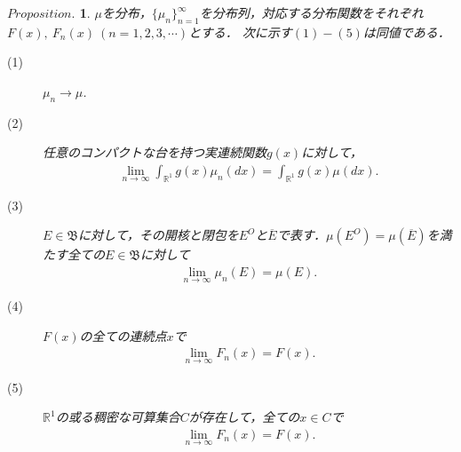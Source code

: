 \documentclass[a4j,papersize,disablejfam,slide,14pt]{jsarticle}
\newtheorem{Prop}{$Proposition.$}
\begin{document}
    \begin{screen}
    	\begin{Prop}
        \label{Prop:convergence_distribution}
        	$\mu$を分布，$\{ \mu_n \}_{n=1}^{\infty}$を分布列，対応する分布関数をそれぞれ$F(x),\ F_n(x)\ (n=1,2,3,\cdots)$とする．
        	次に示す$(1)-(5)$は同値である．
            \begin{description}
            	\item[(1)]\qquad  $\mu_n \to \mu$.
                \item[(2)]\qquad 任意のコンパクトな台を持つ実連続関数$g(x)$に対して，
                	\begin{align}
                		\lim_{n \to \infty} \int_{\mathbb{R}^1} g(x) \mu_n(dx) = \int_{\mathbb{R}^1} g(x) \mu(dx).
                	\end{align}
                \item[(3)]\qquad $E \in \mathfrak{B}$に対して，その開核と閉包を$E^O$と$\overline{E}$で表す．$\mu(E^O) = \mu(\overline{E})$を満たす全ての$E \in \mathfrak{B}$に対して
                	\begin{align}
                		\lim_{n \to \infty} \mu_n(E) = \mu(E).
                	\end{align}
                \item[(4)]\qquad $F(x)$の全ての連続点$x$で
                	\begin{align}
                		\lim_{n \to \infty} F_n(x) = F(x).
                	\end{align}
                \item[(5)]\qquad $\mathbb{R}^1$の或る稠密な可算集合$C$が存在して，全ての$x \in C$で
                	\begin{align}
                    	\lim_{n \to \infty} F_n(x) = F(x).
                	\end{align}
            \end{description}
        \end{Prop}
    \end{screen}
\end{document}
